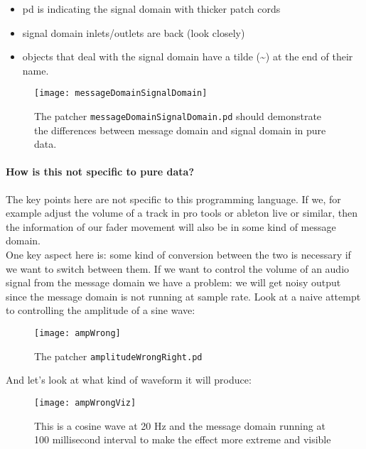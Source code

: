 \begin{itemize}
	\item pd is indicating the signal domain with thicker patch cords
	\item signal domain inlets/outlets are back (look closely)
	\item objects that deal with the signal domain have a tilde (\textasciitilde ) at the end of their name.
\end{itemize}

\begin{figure}[h!]
	\centering
	\texttt{[image: messageDomainSignalDomain]}
	\caption[message domain vs. signal domain]
	{The patcher \texttt{messageDomainSignalDomain.pd} should demonstrate the differences between message domain and signal domain in pure data.}
	\label{fig:mesSig}
\end{figure}

\paragraph{How is this not specific to pure data?} The key points here are not specific to this programming language. If we, for example adjust the volume of a track in pro tools or ableton live or similar, then the information of our fader movement will also be in some kind of message domain.\\
One key aspect here is: some kind of conversion between the two is necessary if we want to switch between them. If we want to control the volume of an audio signal from the message domain we have a problem: we will get noisy output since the message domain is not running at sample rate. Look at a naive attempt to controlling the amplitude of a sine wave:

\begin{figure}[h!]
	\centering
	\texttt{[image: ampWrong]}
	\caption[shortCaption]
	{The patcher \texttt{amplitudeWrongRight.pd} }
	\label{fig:label}
\end{figure}


And let's look at what kind of waveform it will produce:

\begin{figure}[H]
	\centering
	\texttt{[image: ampWrongViz]}
	\caption[shortCaption]
	{This is a cosine wave at 20 Hz and the message domain running at 100 millisecond interval to make the effect more extreme and visible}
	\label{fig:label}
\end{figure}



